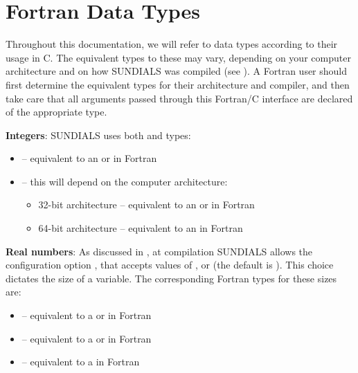 \documentclass[letterpaper,10pt,english]{sphinxmanual}
\begin{document}
\section{Fortran Data Types}
\label{f_interface/index:fortran-data-types}\label{f_interface/index:finterface-datatypes}
Throughout this documentation, we will refer to data types according
to their usage in C.  The equivalent types to these may vary,
depending on your computer architecture and on how SUNDIALS was
compiled (see {\hyperref[Install:installation]{\emph{}}}).  A Fortran user should first
determine the equivalent types for their architecture and compiler,
and then take care that all arguments passed through this Fortran/C
interface are declared of the appropriate type.

\textbf{Integers}: SUNDIALS uses both  and  types:
\begin{itemize}
\item {} 
 -- equivalent to an  or  in Fortran

\item {} 
 -- this will depend on the computer architecture:
\begin{itemize}
\item {} 
32-bit architecture -- equivalent to an  or  in Fortran

\item {} 
64-bit architecture -- equivalent to an  in Fortran

\end{itemize}

\end{itemize}

\textbf{Real numbers}:  As discussed in {\hyperref[Install:installation]{\emph{}}}, at compilation
SUNDIALS allows the configuration option  ,
that accepts values of ,  or  (the
default is ).  This choice dictates the size of a
 variable.  The corresponding Fortran types for these
 sizes are:
\begin{itemize}
\item {} 
 -- equivalent to a  or  in Fortran

\item {} 
 -- equivalent to a  or  in Fortran

\item {} 
 -- equivalent to a  in Fortran

\end{itemize}
\end{document}
